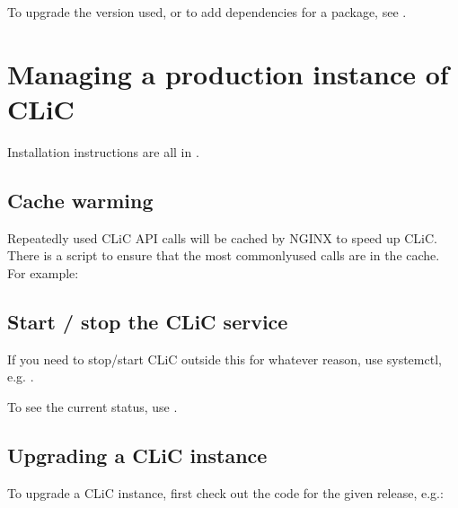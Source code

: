 \documentclass[letterpaper,10pt,english]{sphinxmanual}
\begin{document}
\sphinxAtStartPar
To upgrade the version used, or to add dependencies for a package, see .

\sphinxstepscope


\chapter{Managing a production instance of CLiC}
\label{\detokenize{advanced/production:managing-a-production-instance-of-clic}}\label{\detokenize{advanced/production::doc}}
\sphinxAtStartPar
Installation instructions are all in .


\section{Cache warming}
\label{\detokenize{advanced/production:cache-warming}}
\sphinxAtStartPar
Repeatedly used CLiC API calls will be cached by NGINX to speed up CLiC. There
is a script to ensure that the most commonly\sphinxhyphen{}used calls are in the cache. For
example:

\begin{sphinxVerbatim}[commandchars=\\\{\}]
 
\end{sphinxVerbatim}


\section{Start / stop the CLiC service}
\label{\detokenize{advanced/production:start-stop-the-clic-service}}
\sphinxAtStartPar
If you need to stop/start CLiC outside this for whatever reason, use systemctl,
e.g. .

\sphinxAtStartPar
To see the current status, use .


\section{Upgrading a CLiC instance}
\label{\detokenize{advanced/production:upgrading-a-clic-instance}}
\sphinxAtStartPar
To upgrade a CLiC instance, first check out the code for the given release, e.g.:
\end{document}
